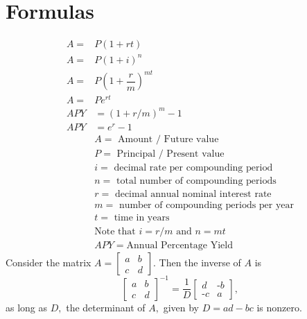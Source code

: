 \documentclass[11pt]{article} %
\begin{document}
\section*{Formulas}
\begin{align*}
A = &P(1+rt)  \\
	A = &P(1+i)^n  \\
	A = &P\left(1+\dfrac{r}{m}\right)^{mt}  \\
	A = &Pe^{rt} \\
	APY &= (1+r/m)^m -1 \\
	APY &= e^r -1 \\
	&A = \text{ Amount / Future value} \\
	&P = \text{ Principal / Present value} \\
	&i = \text{ decimal rate per compounding period} \\
	&n = \text{ total number of compounding periods} \\
	&r = \text{ decimal annual nominal interest rate} \\
	&m = \text{ number of compounding periods per year} \\
	&t = \text{ time in years} \\
	&\text{Note that } i=r/m \text{ and } n= mt \\
	&APY = \text{Annual Percentage Yield}
\end{align*}
Consider the matrix $A = \begin{bmatrix} a & b \\ c & d \end{bmatrix}.$ Then the inverse of $A$ is 
$$\begin{bmatrix} a & b \\ c & d \end{bmatrix}^{-1} = \dfrac{1}{D}\begin{bmatrix} d & \text{-}b \\ \text{-}c & a \end{bmatrix},$$ as long as $D,$ the determinant of $A,$ given by $D = ad-bc$ is nonzero.
\end{document}
